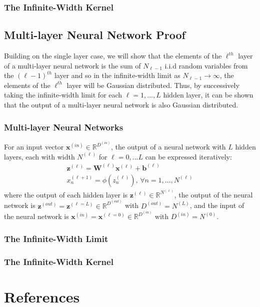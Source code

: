\documentclass[twoside,11pt]{article}
\begin{document}
\subsubsection{The Infinite-Width Kernel}
\subsection{Multi-layer Neural Network Proof \cite{lee2018deep}}
Building on the single layer case, we will show that the elements of the $\ell^{th}$ layer of a multi-layer neural network is the sum of $N_{\ell-1}$ i.i.d random variables from the  $(\ell-1)^{th}$ layer and so in the infinite-width limit as $N_{\ell-1} \rightarrow \infty$, the elements of the $\ell^{th}$ layer will be Gaussian distributed. Thus, by successively taking the infinite-width limit for each $\ell=1,...,L$ hidden layer, it can be shown that the output of a multi-layer neural network is also Gaussian distributed.
\subsubsection{Multi-layer Neural Networks}
For an input vector $\mathbf{x}^{(in)} \in \mathbb{R}^{D^{(in)}}$, the output of a neural network with $L$ hidden layers, each with width $N^{(\ell)}$ for $\ell = 0, \dots L$ can be expressed iteratively:
\begin{align}
    \label{multi-layer-hidden}
    \mathbf{z}^{(\ell)} = \mathbf{W}^{(\ell)} \mathbf{x}^{(\ell)} + \mathbf{b}^{(\ell)}\\
    \label{multi-layer-hidden-non-linearity}
    x_n^{(\ell+1)} = \phi(z_n^{(\ell)})\text{, } \forall n = 1, \dots, N^{(\ell)}
\end{align}
where the output of each hidden layer is $\mathbf{z}^{(\ell)} \in \mathbb{R}^{N^{(\ell)}}$, the output of the neural network is $\mathbf{z}^{(out)} = \mathbf{z}^{(\ell=L)} \in \mathbb{R}^{D^{(out)}}$ with $D^{(out)} = N^{(L)}$, and the input of the neural network is $\mathbf{x}^{(in)} = \mathbf{x}^{(\ell = 0)} \in \mathbb{R}^{D^{(in)}}$ with $D^{(in)} = N^{(0)}$.
\subsubsection{The Infinite-Width Limit}
\subsubsection{The Infinite-Width Kernel}

\begingroup
\let\clearpage\relax
\AtNextBibliography{\small}
\section*{References}
\printbibliography[heading=talikarng, title = {References}]
\endgroup
\end{document}
